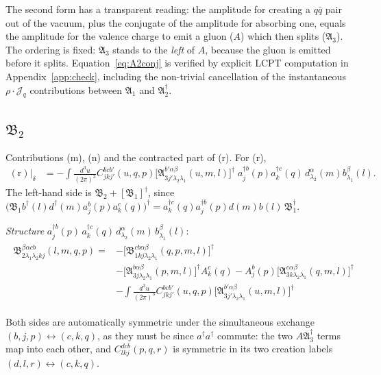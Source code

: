 \documentclass[11pt]{article}
\newcommand{\mf}{\mathfrak}
\newcommand{\dg}{\dagger}
\newcommand{\ip}[1]{\int\!\frac{d^{3}#1}{(2\pi)^{3}}}
\begin{document}
\noindent
The second form has a transparent reading: the amplitude for creating a $q\bar q$ pair out of the
vacuum, plus the conjugate of the amplitude for absorbing one, equals the amplitude for the
valence charge to emit a gluon ($A$) which then splits ($\mf A_{3}$). The ordering is fixed:
$\mf A_{3}$ stands to the \emph{left} of $A$, because the gluon is emitted before it splits.
Equation~\eqref{eq:A2conj} is verified by explicit LCPT computation in
Appendix~\ref{app:check}, including the non-trivial cancellation of the instantaneous
$\rho\cdot\mathcal{J}_q$ contributions between $\mf A_1$ and $\mf A_2^\dg$.

\subsection{$\mf B_{2}$}

Contributions (m), (n) and the contracted part of (r). For (r),
\begin{align}
(\text{r})\Big|_{\delta}
&=-\ip{u}C^{bcb'}_{jkj'}(u,q,p)\Big[\mf A^{b'\alpha\beta}_{3j'\lambda_{2}\lambda_{1}}(u,m,l)\Big]^{\dg}
\;a^{\dg b}_{j}(p)a^{\dg c}_{k}(q)\,d^{\alpha}_{\lambda_{2}}(m)b^{\beta}_{\lambda_{1}}(l).
\end{align}
The left-hand side is $\mf B_{2}+[\mf B_{1}]^{\dg}$, since
$\big(\mf B_{1}b^{\dg}(l)d^{\dg}(m)a^{b}_{j}(p)a^{c}_{k}(q)\big)^{\dg}
=a^{\dg c}_{k}(q)a^{\dg b}_{j}(p)d(m)b(l)\,\mf B_{1}^{\dg}$.

\begin{res}
\emph{Structure} $a^{\dg b}_{j}(p)\,a^{\dg c}_{k}(q)\,d^{\alpha}_{\lambda_{2}}(m)\,b^{\beta}_{\lambda_{1}}(l)$:
\begin{align}
\boxed{
\begin{aligned}
\mf B^{\beta\alpha cb}_{2\lambda_{1}\lambda_{2}kj}(l,m,q,p)
=&-\Big[\mf B^{cb\alpha\beta}_{1kj\lambda_{2}\lambda_{1}}(q,p,m,l)\Big]^{\dg}
\\
&-\Big[\mf A^{b\alpha\beta}_{3j\lambda_{2}\lambda_{1}}(p,m,l)\Big]^{\dg}A^{c}_{k}(q)
-A^{b}_{j}(p)\Big[\mf A^{c\alpha\beta}_{3k\lambda_{2}\lambda_{1}}(q,m,l)\Big]^{\dg}
\\
&-\ip{u}C^{bcb'}_{jkj'}(u,q,p)\Big[\mf A^{b'\alpha\beta}_{3j'\lambda_{2}\lambda_{1}}(u,m,l)\Big]^{\dg}
\end{aligned}}
\label{eq:B2}
\end{align}
\end{res}

\noindent
Both sides are automatically symmetric under the simultaneous exchange
$(b,j,p)\leftrightarrow(c,k,q)$, as they must be since $a^{\dg}a^{\dg}$ commute: the two $A\mf
A^{\dg}_{3}$ terms map into each other, and $C^{dcb}_{lkj}(p,q,r)$ is symmetric in its two
creation labels $(d,l,r)\leftrightarrow(c,k,q)$.
\end{document}
